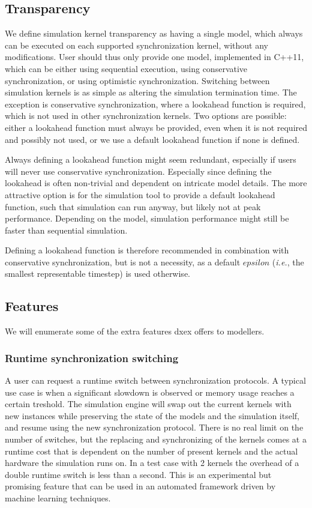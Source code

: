 \subsection{Transparency}
We define simulation kernel transparency as having a single model, which always can be executed on each supported synchronization kernel, without any modifications.
User should thus only provide one model, implemented in C++11, which can be either using sequential execution, using conservative synchronization, or using optimistic synchronization.
Switching between simulation kernels is as simple as altering the simulation termination time.
The exception is conservative synchronization, where a lookahead function is required, which is not used in other synchronization kernels.
Two options are possible: either a lookahead function must always be provided, even when it is not required and possibly not used, or we use a default lookahead function if none is defined.

Always defining a lookahead function might seem redundant, especially if users will never use conservative synchronization.
Especially since defining the lookahead is often non-trivial and dependent on intricate model details.
The more attractive option is for the simulation tool to provide a default lookahead function, such that simulation can run anyway, but likely not at peak performance.
Depending on the model, simulation performance might still be faster than sequential simulation. 

Defining a lookahead function is therefore recommended in combination with conservative synchronization, but is not a necessity, as a default $epsilon$ (\textit{i.e.}, the smallest representable timestep) is used otherwise.

\subsection{Features}
We will enumerate some of the extra features dxex offers to modellers.
\subsubsection{Runtime synchronization switching}
A user can request a runtime switch between synchronization protocols. A typical use case is when a significant slowdown is observed or memory usage reaches a certain treshold. The simulation engine will swap out the current kernels with new instances while preserving the state of the models and the simulation itself, and resume using the new synchronization protocol. There is no real limit on the number of switches, but the replacing and synchronizing of the kernels comes at a runtime cost that is dependent on the number of present kernels and the actual hardware the simulation runs on. In a test case with 2 kernels the overhead of a double runtime switch is less than a second.
This is an experimental but promising feature that can be used in an automated framework driven by machine learning techniques.
